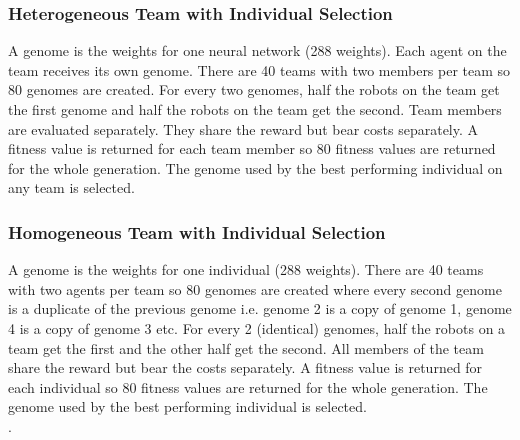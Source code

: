 \documentclass[12pt]{article}  %
\begin{document}
\subsubsection{Heterogeneous Team with Individual Selection}

A genome is the weights for one neural network (288 weights).
Each agent on the team receives its own genome.
There are 40 teams with two members per team so 80 genomes are created.  
For every two genomes, half the robots on the team get the first genome and half the robots on the team get the second. 
Team members are evaluated separately. 
They share the reward but bear costs separately. 
A fitness value is returned for each team member so 80 fitness values are returned for the whole generation. 
The genome used by the best performing individual on any team is selected. \\

\subsubsection{Homogeneous Team with Individual Selection}

A genome is the weights for one individual (288 weights). 
There are 40 teams with two agents per team so 80 genomes are created where every second genome is a duplicate of the previous genome i.e. genome 2 is a copy of genome 1, genome 4 is a copy of genome 3 etc. 
For every 2 (identical) genomes, half the robots on a team get the first and the other half get the second. 
All members of the team share the reward but bear the costs separately. 
A fitness value is returned for each individual so 80 fitness values are returned for the whole generation. 
The genome used by the best performing individual is selected.\\. 
\end{document}
